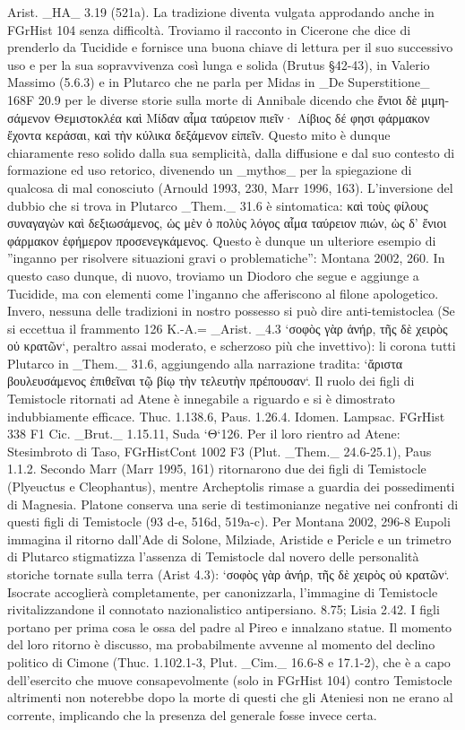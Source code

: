 {Arist. _HA_ 3.19 (521a). La tradizione diventa vulgata approdando anche in FGrHist 104 senza difficoltà. Troviamo il racconto in Cicerone che dice di prenderlo da Tucidide e fornisce una buona chiave di lettura per il suo successivo uso e per la sua sopravvivenza così lunga e solida (Brutus §42-43), in Valerio Massimo (5.6.3) e in Plutarco che ne parla per Midas in _De Superstitione_ 168F 20.9 per le diverse storie sulla morte di Annibale dicendo che \textgreek{ἔνιοι δὲ μιμησάμενον Θεμιστοκλέα καὶ Μίδαν αἷμα ταύρειον πιεῖν· Λίβιος δέ φησι φάρμακον ἔχοντα κεράσαι, καὶ τὴν κύλικα δεξάμενον εἰπεῖν}. Questo mito è dunque chiaramente reso solido dalla sua semplicità, dalla diffusione e dal suo contesto di formazione ed uso retorico, divenendo un _mythos_ per la spiegazione di qualcosa di mal conosciuto (Arnould 1993, 230, Marr 1996, 163). L'inversione del dubbio che si trova in Plutarco _Them._  31.6  è sintomatica: \textgreek{καὶ τοὺς φίλους συναγαγὼν καὶ δεξιωσάμενος, ὡς μὲν ὁ πολὺς λόγος αἷμα ταύρειον πιών, ὡς δ’ ἔνιοι φάρμακον ἐφήμερον προσενεγκάμενος}. Questo è dunque un ulteriore esempio di ''inganno per risolvere situazioni gravi o problematiche'': Montana 2002, 260. In questo caso dunque, di nuovo, troviamo un  Diodoro che segue e aggiunge a Tucidide, ma con elementi come l'inganno che afferiscono al filone apologetico. Invero, nessuna delle tradizioni in nostro possesso si può dire anti-temistoclea (Se si eccettua il frammento 126 K.-A.= _Arist. _4.3 `σοφὸς γὰρ ἁνήρ, τῆς δὲ χειρὸς οὐ κρατῶν`, peraltro assai moderato, e scherzoso più che invettivo): li corona tutti Plutarco in _Them._   31.6, aggiungendo alla narrazione tradita: `ἄριστα βουλευσάμενος ἐπιθεῖναι τῷ βίῳ τὴν τελευτὴν πρέπουσαν`. Il ruolo dei figli di Temistocle ritornati ad Atene è innegabile a riguardo e si è dimostrato indubbiamente efficace. Thuc. 1.138.6, Paus. 1.26.4. Idomen. Lampsac. FGrHist 338 F1 Cic. _Brut._ 1.15.11, Suda `Θ`126. Per il loro rientro ad Atene: Stesimbroto di Taso, FGrHistCont 1002 F3 (Plut. _Them._  24.6-25.1), Paus 1.1.2. Secondo Marr (Marr 1995, 161) ritornarono due dei figli di Temistocle (Plyeuctus e Cleophantus), mentre Archeptolis rimase a guardia dei possedimenti di Magnesia. Platone conserva una serie di testimonianze negative nei confronti di questi figli di Temistocle (93 d-e, 516d, 519a-c). Per Montana 2002, 296-8 Eupoli immagina il ritorno dall'Ade di Solone, Milziade, Aristide e Pericle  e un trimetro di Plutarco stigmatizza l'assenza di Temistocle dal novero delle personalità storiche tornate sulla terra (Arist 4.3): `σοφὸς γὰρ ἁνήρ, τῆς δὲ χειρὸς οὐ κρατῶν`. Isocrate accoglierà completamente, per canonizzarla, l'immagine di Temistocle rivitalizzandone il connotato nazionalistico antipersiano. 8.75; Lisia 2.42. I figli portano per prima cosa le ossa del padre al Pireo e innalzano statue. Il momento del loro ritorno è discusso, ma probabilmente avvenne al momento del declino politico di  Cimone (Thuc. 1.102.1-3, Plut. _Cim._ 16.6-8 e 17.1-2), che è a capo dell'esercito che muove consapevolmente (solo in FGrHist 104) contro Temistocle altrimenti non noterebbe dopo la morte di questi che gli Ateniesi non ne erano al corrente, implicando che la presenza del generale fosse invece certa.
}

